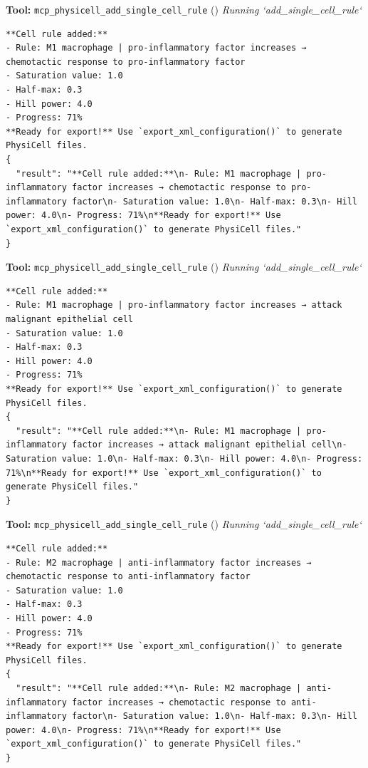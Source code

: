 \documentclass[11pt,a4paper]{article}
\begin{document}
\begin{toolokbox}
\textbf{Tool:} \texttt{mcp\_physicell\_add\_single\_cell\_rule} (\checkmark)
\textit{Running `add\_single\_cell\_rule`}
\begin{lstlisting}
**Cell rule added:**
- Rule: M1 macrophage | pro-inflammatory factor increases → chemotactic response to pro-inflammatory factor
- Saturation value: 1.0
- Half-max: 0.3
- Hill power: 4.0
- Progress: 71%
**Ready for export!** Use `export_xml_configuration()` to generate PhysiCell files.
{
  "result": "**Cell rule added:**\n- Rule: M1 macrophage | pro-inflammatory factor increases → chemotactic response to pro-inflammatory factor\n- Saturation value: 1.0\n- Half-max: 0.3\n- Hill power: 4.0\n- Progress: 71%\n**Ready for export!** Use `export_xml_configuration()` to generate PhysiCell files."
}
\end{lstlisting}
\end{toolokbox}
\begin{toolokbox}
\textbf{Tool:} \texttt{mcp\_physicell\_add\_single\_cell\_rule} (\checkmark)
\textit{Running `add\_single\_cell\_rule`}
\begin{lstlisting}
**Cell rule added:**
- Rule: M1 macrophage | pro-inflammatory factor increases → attack malignant epithelial cell
- Saturation value: 1.0
- Half-max: 0.3
- Hill power: 4.0
- Progress: 71%
**Ready for export!** Use `export_xml_configuration()` to generate PhysiCell files.
{
  "result": "**Cell rule added:**\n- Rule: M1 macrophage | pro-inflammatory factor increases → attack malignant epithelial cell\n- Saturation value: 1.0\n- Half-max: 0.3\n- Hill power: 4.0\n- Progress: 71%\n**Ready for export!** Use `export_xml_configuration()` to generate PhysiCell files."
}
\end{lstlisting}
\end{toolokbox}
\begin{toolokbox}
\textbf{Tool:} \texttt{mcp\_physicell\_add\_single\_cell\_rule} (\checkmark)
\textit{Running `add\_single\_cell\_rule`}
\begin{lstlisting}
**Cell rule added:**
- Rule: M2 macrophage | anti-inflammatory factor increases → chemotactic response to anti-inflammatory factor
- Saturation value: 1.0
- Half-max: 0.3
- Hill power: 4.0
- Progress: 71%
**Ready for export!** Use `export_xml_configuration()` to generate PhysiCell files.
{
  "result": "**Cell rule added:**\n- Rule: M2 macrophage | anti-inflammatory factor increases → chemotactic response to anti-inflammatory factor\n- Saturation value: 1.0\n- Half-max: 0.3\n- Hill power: 4.0\n- Progress: 71%\n**Ready for export!** Use `export_xml_configuration()` to generate PhysiCell files."
}
\end{lstlisting}
\end{toolokbox}
\end{document}
